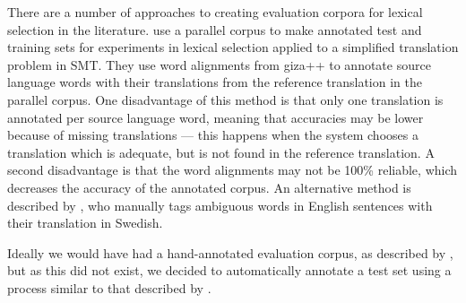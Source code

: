 \documentclass[11pt]{article}
\begin{document}
There are a number of approaches to creating evaluation corpora for
lexical selection in the literature. \cite{vickrey05} use a parallel
corpus to make annotated test and training sets for experiments in
lexical selection applied to a simplified translation problem in
SMT. They use word alignments from {\sc giza++} \citep{och03a} to
annotate source language words with their translations from the
reference translation in the parallel corpus. One disadvantage of this
method is that only one translation is annotated per source language
word, meaning that accuracies may be lower because of missing
translations --- this happens when the system chooses a translation
which is adequate, but is not found in the reference translation. A
second disadvantage is that the word alignments may not be 100\%
reliable, which decreases the accuracy of the annotated corpus. An
alternative method is described by \cite{zinovjeva2000}, who manually
tags ambiguous words in English sentences with their %
translation in Swedish. %


%
Ideally we would have had a hand-annotated evaluation corpus, as
described by \cite{zinovjeva2000}, but as this did not exist, we 
decided to automatically annotate a test set using a process similar to 
that described by \cite{vickrey05}.

\end{document}
